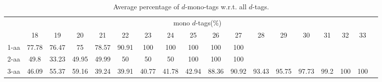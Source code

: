 \begin{table}[h]\tiny
\vspace{3mm}
{\centering
\begin{center}
\begin{tabular}{|l|c|c|c|c|c|c|c|c|c|c|c|c|c|c|c|c|c|}
  \hline
  & \multicolumn{ 16 }{|c|}{mono $d$-tags(\%)} \\
  \cline{2- 17}
    & 18 & 19 & 20 & 21 & 22 & 23 & 24 & 25 & 26 & 27 & 28 & 29 & 30 & 31 & 32 & 33\\
  \hline
1-aa  & 77.78 & 76.47 & 75 & 78.57 & 90.91 & 100 & 100 & 100 & 100 & 100 &  &  &  &  &  & \\
2-aa  & 49.8 & 33.23 & 49.95 & 49.99 & 50 & 50 & 50 & 100 & 100 & 100 &  &  &  &  &  & \\
3-aa  & 46.09 & 55.37 & 59.16 & 39.24 & 39.91 & 40.77 & 41.78 & 42.94 & 88.36 & 90.92 & 93.43 & 95.75 & 97.73 & 99.2 & 100 & 100\\
 \hline
\end{tabular}
\end{center}
\par}
\centering

\caption{ Average percentage of $d$-mono-tags w.r.t. all $d$-tags.}

\vspace{3mm}
\label{table:mono-d-tags}
\end{table}
